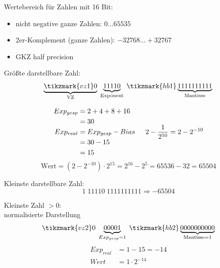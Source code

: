 \documentclass[10pt,a4paper]{scrartcl}
\begin{document}
\noindent
Wertebereich für Zahlen mit 16 Bit:
\begin{itemize}
	\itemsep 0em
	\vspace*{-0.56em}
	\item nicht negative ganze Zahlen: $ 0\ldots65535 $
	\item 2er-Komplement (ganze Zahlen): $ -32768\ldots+32767 $
	\item \ac{GKZ} half precision
\end{itemize}
\vspace*{0.5em}
Größte darstellbare Zahl:\\
\begin{equation*}
\underbrace{\tikzmark{vz1}0}_{\text{VZ}}\; \underbrace{11110}_{\text{Exponent}}\; \tikzmark{hb1} \underbrace{1111111111}_{\text{Mantisse}}\\
\end{equation*}

\begin{equation*}
\begin{aligned}
Exp_{gesp} &= 2+4+8+16 \\
&= 30\\
Exp_{real} &= Exp_{gesp}-Bias\\
&= 30-15 \\&= 15
\end{aligned}
\indent 2-\dfrac{1}{2^{10}} = 2-2^{-10}
\end{equation*}
\begin{equation*}
\text{Wert} = (2-2^{-10})\cdot 2^{15} = 2^{16}-2^{5}=65536-32=65504
\end{equation*}

Kleinste darstellbare Zahl:
\begin{equation*}
1 \; 11110 \; 1111111111 \Rightarrow -65504
\end{equation*}

Kleinste Zahl $>$0:\\
\indent normalisierte Darstellung
\begin{equation*}
	\tikzmark{vz2}0\; \underbrace{00001}_{Exp_{gesp}=1}\; \tikzmark{hb2} \underbrace{0000000000}_{\text{Mantisse} = 1}
\end{equation*}
\begin{align*}
Exp_{real} &= 1-15 = -14\\
Wert &=1\cdot2^{-14}
\end{align*}
\end{document}
